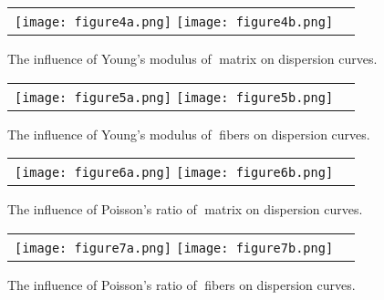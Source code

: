 \documentclass[]{spie}  %
\begin{document}
\begin{figure} [ht]
	\begin{center}
		\begin{tabular}{cc} %
			\texttt{[image: figure4a.png]}
			\texttt{[image: figure4b.png]}
		\end{tabular}
	\end{center}
	\caption[] 
	{ \label{fig:em} 
		The influence of Young's modulus of matrix on dispersion curves.}
\end{figure} 

\begin{figure} [ht]
	\begin{center}
		\begin{tabular}{cc} %
			\texttt{[image: figure5a.png]}
			\texttt{[image: figure5b.png]}
		\end{tabular}
	\end{center}
	\caption[] 
	{ \label{fig:ef} 
		The influence of Young's modulus of fibers on dispersion curves.}
\end{figure} 

\begin{figure} [ht]
	\begin{center}
		\begin{tabular}{cc} %
			\texttt{[image: figure6a.png]}
			\texttt{[image: figure6b.png]}
		\end{tabular}
	\end{center}
	\caption[] 
	{ \label{fig:nim} 
		The influence of Poisson's ratio of matrix on dispersion curves.}
\end{figure} 

\begin{figure} [ht]
	\begin{center}
		\begin{tabular}{cc} %
			\texttt{[image: figure7a.png]}
			\texttt{[image: figure7b.png]}
		\end{tabular}
	\end{center}
	\caption[] 
	{ \label{fig:nif} 
		The influence of Poisson's ratio of fibers on dispersion curves.}
\end{figure} 
\end{document}

